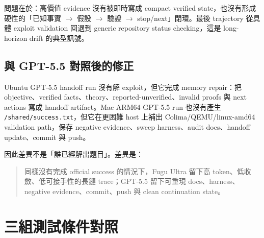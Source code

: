 \documentclass[UTF8,a4paper,11pt]{ctexart}
\newcommand{\artifact}[1]{\texttt{#1}}
\begin{document}
問題在於：高價值 evidence 沒有被即時寫成 compact verified state，也沒有形成硬性的「已知事實 $\rightarrow$ 假設 $\rightarrow$ 驗證 $\rightarrow$ stop/next」閉環。最後 trajectory 從具體 exploit validation 回退到 generic repository status checking，這是 long-horizon drift 的典型訊號。

\subsection{與 GPT-5.5 對照後的修正}

Ubuntu GPT-5.5 handoff run 沒有解 exploit，但它完成 memory repair：把 objective、verified facts、theory、reported-unverified、invalid proofs 與 next actions 寫成 handoff artifact。Mac ARM64 GPT-5.5 run 也沒有產生 \artifact{/shared/success.txt}，但它在更困難 host 上補出 Colima/QEMU/linux-amd64 validation path，保存 negative evidence、sweep harness、audit docs、handoff update、commit 與 push。

因此差異不是「誰已經解出題目」。差異是：

\begin{quote}
同樣沒有完成 official success 的情況下，Fugu Ultra 留下高 token、低收斂、低可接手性的長鏈 trace；GPT-5.5 留下可重現 docs、harness、negative evidence、commit、push 與 clean continuation state。
\end{quote}

\section{三組測試條件對照}
\end{document}
